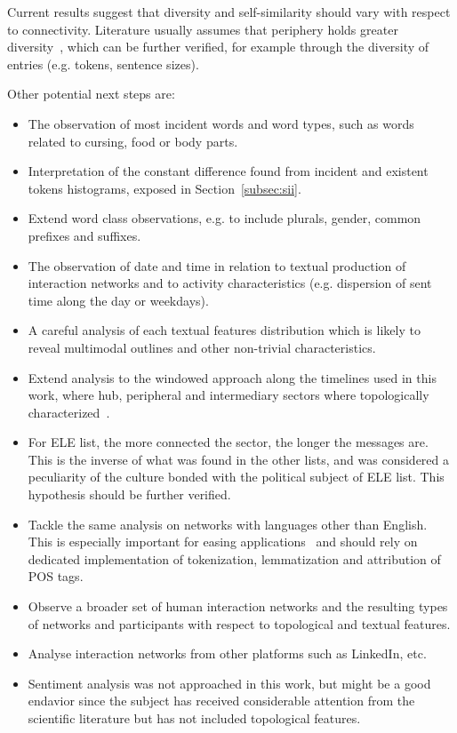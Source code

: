 Current results suggest that diversity and self-similarity should vary with respect to connectivity. 
Literature usually assumes that periphery holds greater diversity~\cite{easley},
which can be further verified, for example through the diversity of entries (e.g. tokens, sentence sizes).

Other potential next steps are:
\begin{itemize}
    \item The observation of most incident words and word types,
	    such as words related to cursing, food or body parts.
    \item Interpretation of the constant difference found from incident and existent tokens histograms,
	    exposed in Section~\ref{subsec:sii}.
    \item Extend word class observations, e.g. to include plurals, gender, common prefixes and suffixes.
    \item The observation of date and time in relation to textual production of interaction networks and
	    to activity characteristics (e.g. dispersion of sent time along the day or weekdays).
    \item A careful analysis of each textual features distribution which is likely to reveal multimodal outlines and other non-trivial characteristics.
    \item Extend analysis to the windowed approach along the timelines used in this work, where hub, peripheral and intermediary sectors where topologically characterized~\cite{evoSN}.
    \item For ELE list, the more connected the sector, the longer the messages are.
	    This is the inverse of what was found in the other lists,
	    and was considered a peculiarity of the culture bonded with the political subject of ELE list.
	    This hypothesis should be further verified.
    \item Tackle the same analysis on networks with languages other than English.
	    This is especially important for easing applications~\cite{ensaio}
	    and should rely on dedicated implementation of 
	    tokenization, lemmatization and attribution of POS tags.
    \item Observe a broader set of human interaction networks and the resulting types
	    of networks and participants with respect to topological and textual features.
    \item Analyse interaction networks from other platforms such as LinkedIn, etc.
    \item Sentiment analysis was not approached in this work, but might be a good endavior since the subject has received considerable attention from the scientific literature but has not included topological features.
\end{itemize}
 

